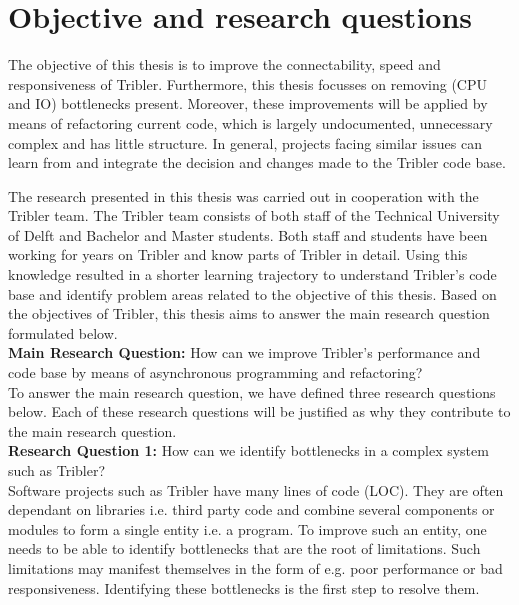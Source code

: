 \section{Objective and research questions}
\label{chp1:sct:objectives-research-questions}
The objective of this thesis is to improve the connectability, speed and responsiveness of Tribler. Furthermore, this thesis focusses on removing (CPU and IO) bottlenecks present.
Moreover, these improvements will be applied by means of refactoring current code, which is largely undocumented, unnecessary complex and has little structure.
In general, projects facing similar issues can learn from and integrate the decision and changes made to the Tribler code base.

The research presented in this thesis was carried out in cooperation with the Tribler team. 
The Tribler team consists of both staff of the Technical University of Delft and Bachelor and Master students.
Both staff and students have been working for years on Tribler and know parts of Tribler in detail.
Using this knowledge resulted in a shorter learning trajectory to understand Tribler's code base and identify problem areas related to the objective of this thesis.
Based on the objectives of Tribler, this thesis aims to answer the main research question formulated below.\\

\noindent
\textbf{Main Research Question:} How can we improve Tribler's performance and code base by means of asynchronous programming and refactoring?\\

To answer the main research question, we have defined three research questions below. Each of these research questions will be justified as why they contribute to the main research question.\\

\noindent
\textbf{Research Question 1:} How can we identify bottlenecks in a complex system such as Tribler?\\

Software projects such as Tribler have many lines of code (LOC). 
They are often dependant on libraries i.e. third party code and combine several components or modules to form a single entity i.e. a program.
To improve such an entity, one needs to be able to identify bottlenecks that are the root of limitations.
Such limitations may manifest themselves in the form of e.g. poor performance or bad responsiveness.
Identifying these bottlenecks is the first step to resolve them.\\

